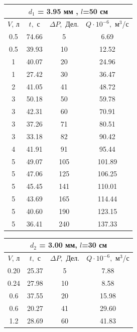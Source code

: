 \documentclass[a4paper]{article}
\begin{document}
	\begin{table}[h!]
		\bgroup
		\def\arraystretch{1.0}%
		\centering
		\begin{minipage}{.52\linewidth}
			\centering
			\begin{tabular}{|c|c|c|c|}
				\hline
				\multicolumn{4}{|c|}{$d_1$ = 3.95 мм , $l$=50 см}\\ \hline
				$V$, $\text{л} $& $t,$ с&$\Delta P,$ Дел.  & $Q\cdot 10^{-6},$ $\text{м}^3$/с\\ \hline
		0.5 & 74.66& 5 & 6.69 \\ \hline
		0.5 & 39.93 & 10 & 12.52\\ \hline
		1 & 40.07 & 20 & 24.96 \\ \hline
		1 & 27.42 & 30 & 36.47 \\ \hline
		2 & 41.05 & 41 & 48.72\\ \hline
		3 &50.18  & 50 &  59.78 \\ \hline
		3 & 42.31 & 60 & 70.91 \\ \hline 
		3 & 37.26 & 71 & 80.51 \\ \hline \hline 
		3 & 33.18 & 82 &  90.42\\ \hline
		4 & 41.91 & 91 &  95.44\\ \hline
		5 & 49.07 & 105 & 101.89\\ \hline
		5 & 47.06 & 125 &  106.25\\ \hline
		5 & 45.45 & 141 &  110.01\\ \hline					
		5 & 43.69 & 165 &  114.44\\ \hline
		5 & 40.60 & 190 &  123.15\\ \hline
		5 & 36.41 & 240 &  137.33\\ \hline
	\end{tabular}
	\end{minipage}
	\begin{minipage}{.5\linewidth}
		\centering
		\begin{tabular}{|c|c|c|c|}
			\hline
			\multicolumn{4}{|c|}{$d_2$ = 3.00 мм, $l$=30 см }\\ \hline
			$V$, $\text{л}$& $t,$ с&$\Delta P,$ Дел.  & $Q\cdot 10^{-6},$ $\text{м}^3$/с\\ \hline
			0.20 & 25.37 & 5 & 7.88 \\ \hline
			0.24 & 27.98 & 10 & 8.58 \\ \hline
			0.6 & 37.55 & 20 & 15.98 \\ \hline
			0.6 & 20.27 & 41 & 29.60 \\ \hline
			1.2 & 28.69 & 60 & 41.83\\ \hline

\end{tabular}
\end{minipage}
\end{table}
\end{document}
